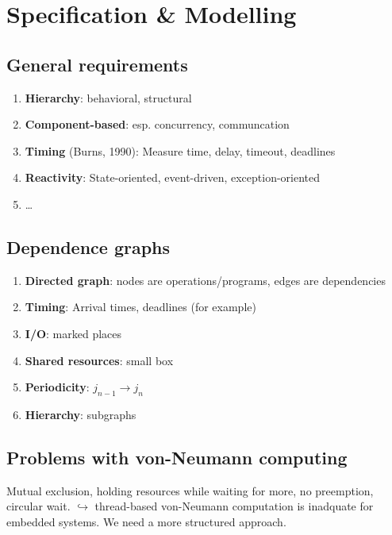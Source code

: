 \documentclass{article}
\author{Leopold Lemmermann}
\begin{document}
\createtitle

\section{Specification \& Modelling}

\subsection{General requirements}
\begin{enumerate}
  \item \textbf{Hierarchy}: behavioral, structural
  \item \textbf{Component-based}: esp. concurrency, communcation
  \item \textbf{Timing} (Burns, 1990): Measure time, delay, timeout, deadlines
  \item \textbf{Reactivity}: State-oriented, event-driven, exception-oriented
  \item …
\end{enumerate}

\subsection{Dependence graphs}
\begin{enumerate}
  \item \textbf{Directed graph}: nodes are operations/programs, edges are dependencies
  \item \textbf{Timing}: Arrival times, deadlines (for example)
  \item \textbf{I/O}: marked places
  \item \textbf{Shared resources}: small box
  \item \textbf{Periodicity}: $j_{n-1} \rightarrow j_n$
  \item \textbf{Hierarchy}: subgraphs
\end{enumerate}

\subsection{Problems with von-Neumann computing}
Mutual exclusion, holding resources while waiting for more, no preemption, circular wait.
$\hookrightarrow$ thread-based von-Neumann computation is inadquate for embedded systems. We need a more structured approach.
\end{document}
